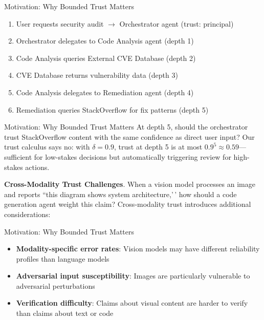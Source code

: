 \documentclass[
  ignorenonframetext,
]{beamer}
\begin{document}
\begin{frame}[allowframebreaks]{Motivation: Why Bounded Trust Matters}
\begin{enumerate}
\item User requests security audit $\rightarrow$ Orchestrator agent (trust: principal)
\item Orchestrator delegates to Code Analysis agent (depth 1)
\item Code Analysis queries External CVE Database (depth 2)
\item CVE Database returns vulnerability data (depth 3)
\item Code Analysis delegates to Remediation agent (depth 4)
\item Remediation queries StackOverflow for fix patterns (depth 5)
\end{enumerate}

\end{frame}

\begin{frame}[allowframebreaks]{Motivation: Why Bounded Trust Matters}
At depth 5, should the orchestrator trust StackOverflow content with the
same confidence as direct user input? Our trust calculus says no: with
\(\delta = 0.9\), trust at depth 5 is at most
\(0.9^5 \approx 0.59\)---sufficient for low-stakes decisions but
automatically triggering review for high-stakes actions.

\textbf{Cross-Modality Trust Challenges}. When a vision model processes
an image and reports ``this diagram shows system architecture,'\,' how
should a code generation agent weight this claim? Cross-modality trust
introduces additional considerations:

\end{frame}

\begin{frame}[allowframebreaks]{Motivation: Why Bounded Trust Matters}
\begin{itemize}
\item \textbf{Modality-specific error rates}: Vision models may have different reliability profiles than language models
\item \textbf{Adversarial input susceptibility}: Images are particularly vulnerable to adversarial perturbations
\item \textbf{Verification difficulty}: Claims about visual content are harder to verify than claims about text or code
\end{itemize}

\end{frame}
\end{document}
